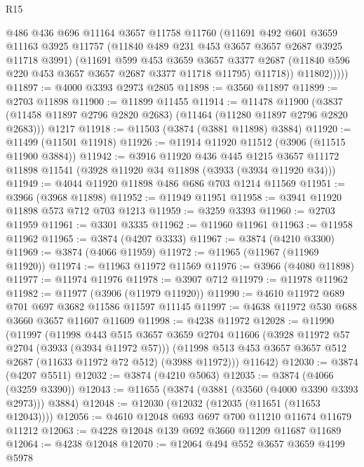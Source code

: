 \begin{lexlean}{R15}
\begin{coremodule}
              @486
              @436
              @696
              @11164
              @3657
              @11758
              @11760
              (@11691
                @492
                @601
                @3659
                @11163
                @3925
                @11757
                (@11840 @489 @231 @453 @3657 @3657 @2687 @3925 @11718 @3991)
                (@11691
                  @599
                  @453
                  @3659
                  @3657
                  @3377
                  @2687
                  (@11840 @596 @220 @453 @3657 @3657 @2687 @3377 @11718 @11795)
                  @11718))
              @11802)))))
@11897 := @4000 @3393 @2973 @2805
@11898 := @3560 @11897
@11899 := @2703 @11898
@11900 := @11899 @11455
@11914 := @11478
    @11900
    (@3837 (@11458 @11897 @2796 @2820 @2683) (@11464 (@11280 @11897 @2796 @2820 @2683)))
    @1217
@11918 := @11503 (@3874 (@3881 @11898) @3884)
@11920 := @11499 (@11501 @11918)
@11926 := @11914 @11920 @11512 (@3906 (@11515 @11900 @3884))
@11942 := @3916
    @11920
    @436
    @445
    @1215
    @3657
    @11172
    @11898
    @11541
    (@3928 @11920 @34 @11898 (@3933 (@3934 @11920 @34)))
@11949 := @4044 @11920 @11898 @486 @686 @703 @1214 @11569
@11951 := @3966 (@3968 @11898)
@11952 := @11949 @11951
@11958 := @3941 @11920 @11898 @573 @712 @703 @1213
@11959 := @3259 @3393
@11960 := @2703 @11959
@11961 := @3301 @3335
@11962 := @11960 @11961
@11963 := @11958 @11962
@11965 := @3874 (@4207 @3333)
@11967 := @3874 (@4210 @3300)
@11969 := @3874 (@4066 @11959)
@11972 := @11965 (@11967 (@11969 @11920))
@11974 := @11963 @11972 @11569
@11976 := @3966 (@4080 @11898)
@11977 := @11974 @11976
@11978 := @3907 @712
@11979 := @11978 @11962
@11982 := @11977 (@3906 (@11979 @11920))
@11990 := @4610 @11972 @689 @701 @697 @3682 @11586 @11597 @11145
@11997 := @4638 @11972 @530 @688 @3660 @3657 @11607 @11609
@11998 := @4238 @11972
@12028 := @11990
    (@11997
      (@11998
        @443
        @515
        @3657
        @3659
        @2704
        @11606
        (@3928 @11972 @57 @2704 (@3933 (@3934 @11972 @57)))
        (@11998 @513 @453 @3657 @3657 @512 @2687 (@11633 @11972 @72 @512) (@3988 @11972)))
      @11642)
@12030 := @3874 (@4207 @5511)
@12032 := @3874 (@4210 @5063)
@12035 := @3874 (@4066 (@3259 @3390))
@12043 := @11655 (@3874 (@3881 (@3560 (@4000 @3390 @3393 @2973))) @3884)
@12048 := @12030 (@12032 (@12035 (@11651 (@11653 @12043))))
@12056 := @4610 @12048 @693 @697 @700 @11210 @11674 @11679 @11212
@12063 := @4228 @12048 @139 @692 @3660 @11209 @11687 @11689
@12064 := @4238 @12048
@12070 := @12064 @494 @552 @3657 @3659 @4199 @5978

\end{coremodule}
\end{lexlean}
